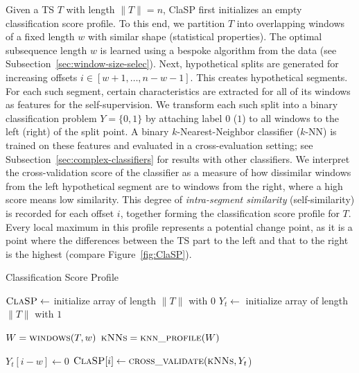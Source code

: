 \documentclass[pdflatex,sn-basic]{sn-jnl}
\begin{document}
Given a TS $T$ with length $\|T\|=n$, ClaSP first initializes an empty classification score profile. To this end, we partition $T$ into overlapping windows of a fixed length $w$ with similar shape (statistical properties). The optimal subsequence length $w$ is learned using a bespoke algorithm from the data (see Subsection~\ref{sec:window-size-selec}). Next, hypothetical splits are generated for increasing offsets $i \in [w+1,\dots,n-w-1]$. This creates hypothetical segments. For each such segment, certain characteristics are extracted for all of its windows as features for the self-supervision. We transform each such split into a binary classification problem $Y=\{0,1\}$ by attaching label $0$ ($1$) to all windows to the left (right) of the split point. A binary $k$-Nearest-Neighbor classifier ($k$-NN) is trained on these features and evaluated in a cross-evaluation setting; see Subsection~\ref{sec:complex-classifiers} for results with other classifiers. We interpret the cross-validation score of the classifier as a measure of how dissimilar windows from the left hypothetical segment are to windows from the right, where a high score means low similarity. This degree of \emph{intra-segment similarity} (self-similarity) is recorded for each offset $i$, together forming the classification score profile for $T$. Every local maximum in this profile represents a potential change point, as it is a point where the differences between the TS part to the left and that to the right is the highest (compare Figure~\ref{fig:ClaSP}). 

\begin{algorithm}[t]
	\caption{Classification Score Profile}\label{alg:clasp}
	\begin{algorithmic}[1]
			
			\State $\textsc{ClaSP} \gets $ initialize array of length $\|T\|$ with 0
			\State $Y_t \gets $ initialize array of length $\|T\|$ with $1$ 
			
			\State $W = \textsc{windows}(T, w)$ 
			\State $\textsc{kNNs} = \textsc{knn\_profile}(W)$
	    
			\For{$i \in [w+1 , \dots, \|T\|-w-1) $} 
                \State $Y_t[i-w] \gets 0$ 
			    \State $\textsc{ClaSP}[i] \gets \textsc{cross\_validate}(\textsc{kNNs},Y_t$)
			\EndFor 
			\State {}
		\EndProcedure
	\end{algorithmic}
\end{algorithm}
\end{document}
